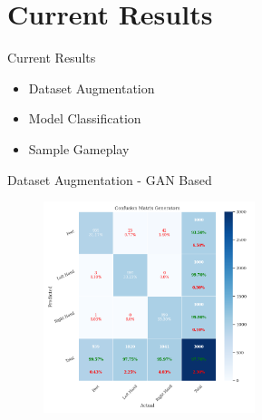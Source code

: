 \section{Current Results}
\begin{frame}{Current Results}
    \begin{itemize}
        \item Dataset Augmentation
        \item Model Classification
        \item Sample Gameplay
    \end{itemize}
\end{frame}

\begin{frame}{Dataset Augmentation - GAN Based}
    \begin{figure}[htpb!]
        \centering
        \includegraphics[width=0.55\textwidth]{figures/augmentation/gan/confusion_matrix_generators_generators_using_LSTMNet_0.5943600867678959.pkl.png}
    \end{figure}
\end{frame}

